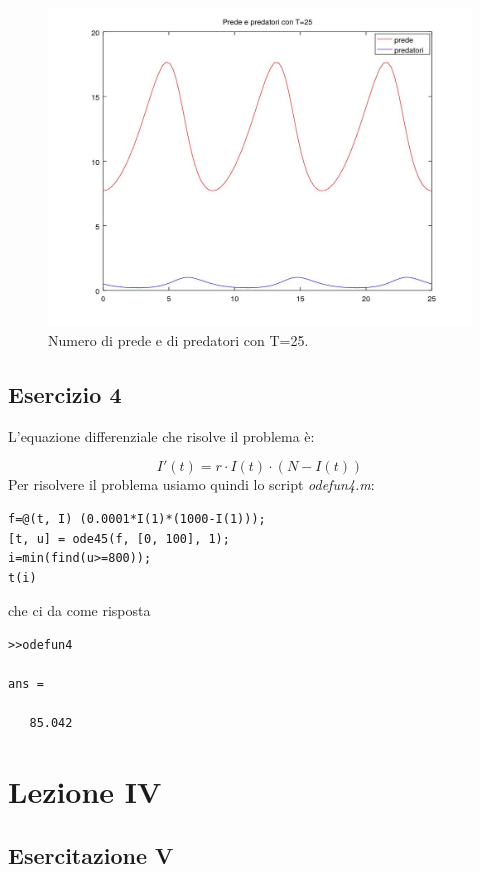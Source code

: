 \documentclass[11pt,a4paper,twoside,openright,titlepage,
headinclude,footinclude,BCOR5mm,
numbers=noenddot,cleardoublepage=empty,
tablecaptionabove]{scrbook}
\begin{document}
\begin{center}
\begin{figure}[h!]
\includegraphics[width=\textwidth]{figs/predatori_prede_25.jpg}
\caption{Numero di prede e di predatori con T=25.}
\end{figure}
\end{center}

\newpage
\section{Esercizio 4}
L'equazione differenziale che risolve il problema è:

\[
I'(t) = r\cdot I(t)\cdot (N-I(t))
\]
Per risolvere il problema usiamo quindi lo script \emph{odefun4.m}:
\begin{lstlisting}[frame = trBL]
f=@(t, I) (0.0001*I(1)*(1000-I(1)));
[t, u] = ode45(f, [0, 100], 1);
i=min(find(u>=800));
t(i)
\end{lstlisting}
che ci da come risposta
\begin{lstlisting}[frame = lines]
>>odefun4

ans = 

   85.042
\end{lstlisting}

\chapter{Lezione IV}
\section{Esercitazione V}
\end{document}
